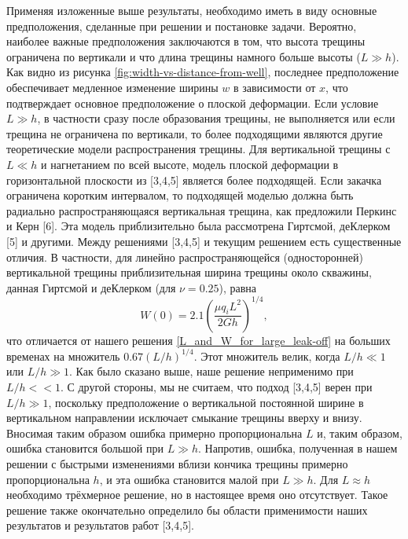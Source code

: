 \documentclass[a4paper, 12pt]{article}
\begin{document}
Применяя изложенные выше результаты, необходимо иметь в виду основные предположения, сделанные при решении и постановке задачи.
Вероятно, наиболее важные предположения заключаются в том, что высота трещины ограничена по вертикали и что длина трещины намного больше высоты ($L\gg h$).
Как видно из рисунка \ref{fig:width-vs-distance-from-well}, последнее предположение обеспечивает медленное изменение ширины $w$ в зависимости от $x$, что подтверждает основное предположение о плоской деформации.
Если условие $L\gg h$, в частности сразу после образования трещины, не выполняется или если трещина не ограничена по вертикали, то более подходящими являются другие теоретические модели распространения трещины.
Для вертикальной трещины с $L\ll h$ и нагнетанием по всей высоте, модель плоской деформации в горизонтальной плоскости из [3,4,5] является более подходящей.
Если закачка ограничена коротким интервалом, то подходящей моделью должна быть радиально распространяющаяся вертикальная трещина, как предложили Перкинс и Керн [6].
Эта модель приблизительно была рассмотрена Гиртсмой, деКлерком [5] и другими.
Между решениями [3,4,5] и текущим решением есть существенные отличия.
В частности, для линейно распространяющейся (односторонней) вертикальной трещины приблизительная ширина трещины около скважины, данная Гиртсмой и деКлерком (для $\nu=0.25$), равна
$$
W(0)=2.1\left(\frac{\mu q_iL^2}{2Gh}\right)^{1/4},
$$
что отличается от нашего решения \eqref{L_and_W_for_large_leak-off} на больших временах на множитель $0.67\left(L/h\right)^{1/4}$.
Этот множитель велик, когда $L/h\ll1$ или $L/h\gg1$.
Как было сказано выше, наше решение неприменимо при $L/h<<1$.
С другой стороны, мы не считаем, что подход [3,4,5] верен при $L/h\gg 1$, поскольку предположение о вертикальной постоянной ширине в вертикальном направлении исключает смыкание трещины вверху и внизу.
Вносимая таким образом ошибка примерно пропорциональна $L$ и, таким образом, ошибка становится большой при $L\gg h$.
Напротив, ошибка, полученная в нашем решении с быстрыми изменениями вблизи кончика трещины примерно пропорциональна $h$, и эта ошибка становится малой при $L\gg h$.
Для $L\approx h$ необходимо трёхмерное решение, но в настоящее время оно отсутствует.
Такое решение также окончательно определило бы области применимости наших результатов и результатов работ [3,4,5].
\end{document}
